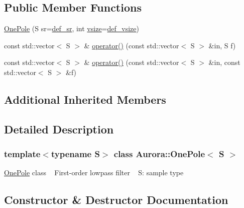 \subsection*{Public Member Functions}
\begin{DoxyCompactItemize}
\item 
\hyperlink{class_aurora_1_1_one_pole_a9a0d15d8caa6ed67767b8e97a059ceaa}{One\+Pole} (S sr=\hyperlink{namespace_aurora_ad49263d809bea98dd422e95bc91bc03e}{def\+\_\+sr}, int \hyperlink{class_aurora_1_1_snd_base_af9e21aaf411b17f7a8221c991ce5d291}{vsize}=\hyperlink{namespace_aurora_afaaddf667a06e7ce23c667a8b7295263}{def\+\_\+vsize})
\item 
const std\+::vector$<$ S $>$ \& \hyperlink{class_aurora_1_1_one_pole_a34c297cdef0928ffd6e13e0603c5ef9d}{operator()} (const std\+::vector$<$ S $>$ \&in, S f)
\item 
const std\+::vector$<$ S $>$ \& \hyperlink{class_aurora_1_1_one_pole_ab126ef60b5f354c5aec0b62636bbb01d}{operator()} (const std\+::vector$<$ S $>$ \&in, const std\+::vector$<$ S $>$ \&f)
\end{DoxyCompactItemize}
\subsection*{Additional Inherited Members}


\subsection{Detailed Description}
\subsubsection*{template$<$typename S$>$\newline
class Aurora\+::\+One\+Pole$<$ S $>$}

\hyperlink{class_aurora_1_1_one_pole}{One\+Pole} class ~\newline
First-\/order lowpass filter ~\newline
S\+: sample type 

\subsection{Constructor \& Destructor Documentation}
\mbox{\label{class_aurora_1_1_one_pole_a9a0d15d8caa6ed67767b8e97a059ceaa}} 
